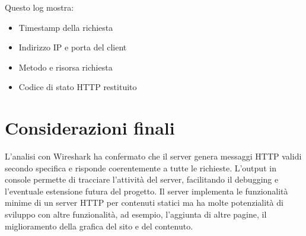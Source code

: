 \documentclass[a4paper,12pt]{report}
\begin{document}
Questo log mostra:
\begin{itemize}
    \item Timestamp della richiesta
    \item Indirizzo IP e porta del client
    \item Metodo e risorsa richiesta
    \item Codice di stato HTTP restituito
\end{itemize}

\chapter{Considerazioni finali }

L’analisi con Wireshark ha confermato che il server genera messaggi HTTP validi secondo specifica e risponde coerentemente a tutte le 
richieste. L’output in console permette di tracciare l’attività del server, facilitando il debugging e l’eventuale estensione futura del
progetto. 
Il server implementa le funzionalità minime di un server HTTP per contenuti statici ma ha molte potenzialità di sviluppo con altre funzionalità,
ad esempio, l'aggiunta di altre pagine, il miglioramento della grafica del sito e del contenuto. 
\end{document}
